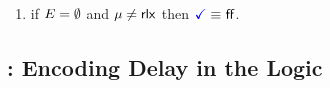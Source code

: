 \begin{definition}
\begin{enumerate}[topsep=0pt,label=(\textsc{r}\arabic*),ref=\textsc{r}\arabic*]
  \item \label{read-term-ca-addr}
    if $E=\emptyset$ and $\mu\neq{\mathsf{rlx}}$ then $\aTerm \riff \FALSE$. 
  \end{enumerate}
\end{definition}



\subsection{\PwTmcaTITLE{}: Encoding Delay in the Logic}
\label{sec:delay}

